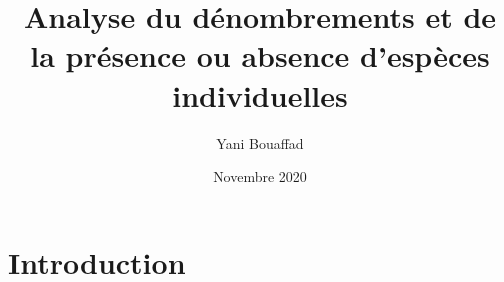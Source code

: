 \documentclass{article}
\title{Analyse du dénombrements et de la présence ou absence d'espèces individuelles}
\author{Yani Bouaffad}
\date{Novembre 2020}
\theoremstyle{definition}
\begin{document}
\maketitle


\section*{Introduction}
\end{document}
